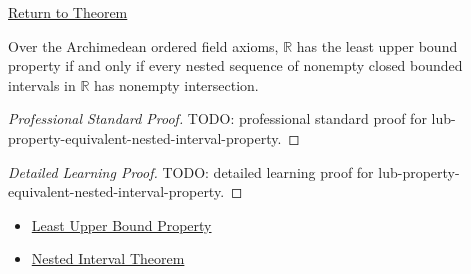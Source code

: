 \newpage
{}
\label{prf:lub-property-equivalent-nested-interval-property}

\begin{remark*}[Return]
\hyperref[thm:lub-property-equivalent-nested-interval-property]{Return to Theorem}
\end{remark*}

\begin{theorem*}
Over the Archimedean ordered field axioms, $\mathbb{R}$ has the least upper
bound property if and only if every nested sequence of nonempty closed bounded
intervals in $\mathbb{R}$ has nonempty intersection.
\end{theorem*}

\begin{proof}[Professional Standard Proof]
\LRAProofBodyStart
TODO: professional standard proof for lub-property-equivalent-nested-interval-property.
\end{proof}

\begin{proof}[Detailed Learning Proof]
\LRAProofBodyStart
TODO: detailed learning proof for lub-property-equivalent-nested-interval-property.
\end{proof}

\begin{remark*}
\end{remark*}

\begin{dependencies}
\begin{itemize}
  \item \hyperref[def:least-upper-bound-property]{Least Upper Bound Property}
  \item \hyperref[thm:nested-interval-theorem]{Nested Interval Theorem}
\end{itemize}
\end{dependencies}

\clearpage
